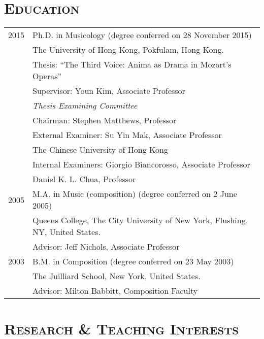 \documentclass[a4paper,11pt]{article}
\begin{document}
  \vspace*{2.5mm}
  
  \section*{\textsc{Education}}
  
  \hspace*{-0.25cm}
  \begin{tabular}{p{2.5cm} l}
    2015 & Ph.D. in Musicology (degree conferred on 28 November 2015)\\
    & The University of Hong Kong, Pokfulam, Hong Kong.\\
    & Thesis: ``The Third Voice: Anima as Drama in Mozart's Operas''\\
    & Supervisor: Youn Kim, Associate Professor\\[2mm]
    & \textit{Thesis Examining Committee}\\
    & Chairman: Stephen Matthews, Professor\\
    & External Examiner: Su Yin Mak, Associate Professor\\
    & \hspace*{28.5mm} The Chinese University of Hong Kong\\
    & Internal Examiners: Giorgio Biancorosso, Associate Professor\\
    & \hspace*{29.5mm} Daniel K. L. Chua, Professor\\[2mm]
    
	2005 & M.A. in Music (composition) (degree conferred on 2 June 2005)\\
	& Queens College, The City University of New York, Flushing, NY, United States.\\
	& Advisor: Jeff Nichols, Associate Professor\\[2mm]

    2003 & B.M. in Composition (degree conferred on 23 May 2003)\\
    & The Juilliard School, New York, United States.\\
    & Advisor: Milton Babbitt, Composition Faculty
  \end{tabular}
  
  \vspace{5mm}
  
  \section*{\textsc{Research \& Teaching Interests}}
  
\end{document}
